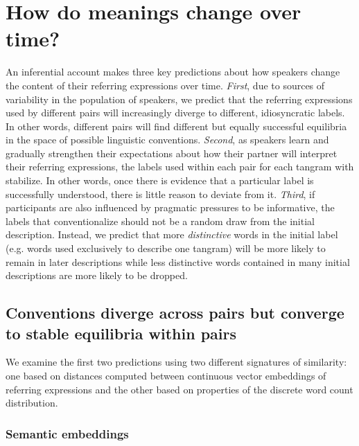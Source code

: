 \documentclass[alpha-refs]{wiley-article}
\begin{document}

\section{How do meanings change over time?}

An inferential account makes three key predictions about how speakers change the content of their referring expressions over time.
\emph{First}, due to sources of variability in the population of speakers, we predict that the referring expressions used by different pairs will increasingly diverge to different, idiosyncratic labels.
In other words, different pairs will find different but equally successful equilibria in the space of possible linguistic conventions.
\emph{Second}, as speakers learn and gradually strengthen their expectations about how their partner will interpret their referring expressions, the labels used within each pair for each tangram with stabilize.
In other words, once there is evidence that a particular label is successfully understood, there is little reason to deviate from it.
\emph{Third}, if participants are also influenced by pragmatic pressures to be informative, the labels that conventionalize should not be a random draw from the initial description. 
Instead, we predict that more \emph{distinctive} words in the initial label (e.g. words used exclusively to describe one tangram) will be more likely to remain in later descriptions while less distinctive words contained in many initial descriptions are more likely to be dropped.

\subsection{Conventions diverge across pairs but converge to stable equilibria within pairs}

We examine the first two predictions using two different signatures of similarity: one based on distances computed between continuous vector embeddings of referring expressions and the other based on properties of the discrete word count distribution.

\subsubsection{Semantic embeddings}
\end{document}
